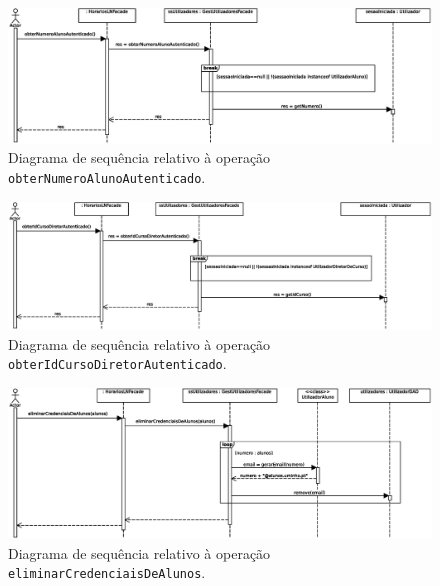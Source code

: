 \documentclass[12pt, a4paper]{article}
\begin{document}
\begin{landscape}
        \vspace*{\fill}
        \pagebreak
        \vspace*{\fill}

        \begin{figure}[H]
            \centering
            \includegraphics[width=\textwidth]{Imagens/Modelos/obterNumeroAlunoAutenticadoDAO.svg.eps}
            \caption{
                Diagrama de sequência relativo à operação \texttt{obterNumeroAlunoAutenticado}.
            }
        \end{figure}

        \begin{figure}[H]
            \centering
            \includegraphics[width=\textwidth]{Imagens/Modelos/obterIdCursoDiretorAutenticadoDAO.svg.eps}
            \caption{
                Diagrama de sequência relativo à operação \texttt{obterIdCursoDiretorAutenticado}.
            }
        \end{figure}

        \vspace*{\fill}
        \pagebreak
        \vspace*{\fill}

        \begin{figure}[H]
            \centering
            \includegraphics[scale=0.85]{Imagens/Modelos/eliminarCredenciaisDeAlunosDAO.svg.eps}
            \caption{
                Diagrama de sequência relativo à operação \texttt{eliminarCredenciaisDeAlunos}.
            }
        \end{figure}


\end{landscape}
\end{document}
